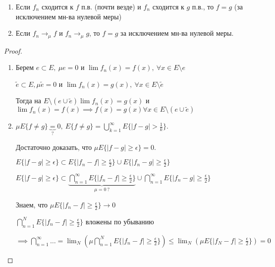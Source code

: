 \begin{statement}
    \begin{enumerate}
        \item {
            Если $f_n$ сходится к $f$ п.в. (почти везде) и $f_n$ сходится к $g$ п.в., то $f = g$ (за исключением мн-ва нулевой меры)
        }
        \item {
            Если $f_n \rightarrow_{\mu} f$ и $f_n \rightarrow_{\mu} g$, то $f = g$ за исключением мн-ва нулевой меры.
        }
    \end{enumerate}
\end{statement}
\begin{proof}
    \begin{enumerate}
        \item {
            Берем $e \subset E, \ \mu e = 0$ и $\lim{f_n(x)} = f(x), \ \forall x \in E \setminus e$

            $\tilde{e} \subset E, \mu \tilde{e} = 0$ и $\lim{f_n(x)} = g(x), \ \forall x \in E \setminus \tilde{e}$
        
            Тогда на $E \setminus (e \cup \tilde{e}) \lim f_n(x) = g(x)$ и $\lim f_n(x) = f(x) \implies f(x) = g(x) \forall x \in E \setminus (e \cup \tilde{e})$ 
        }
        \item {
            $\mu E \{ f \not = g \} \underbrace{=}_{?} 0, \ E\{ f \not = g \} = \bigcup_{k=1}^{\infty} E \{ |f - g| > \frac{1}{k} \}$.

            Достаточно доказать, что $\mu E \{ |f - g| \geq \epsilon \} = 0$.

            $E \{ |f - g| \geq \epsilon \} \subset E \{ |f_n - f| \geq \frac{\epsilon}{2} \} \cup E \{ |f_n - g| \geq \frac{\epsilon}{2} \}$


            $E \{ |f - g| \geq \epsilon \} \subset \underbrace{\bigcap_{n=1}^{\infty} E \{ |f_n - f| \geq \frac{\epsilon}{2} \}}_{\mu = 0 \ ?} \cup \bigcap_{n=1}^{\infty} E \{ |f_n - g| \geq \frac{\epsilon}{2} \}$

            Знаем, что $\mu E \{ |f_n - f| \geq \frac{\epsilon}{2} \} \rightarrow 0$

            $\bigcap_{n=1}^{N} E \{ |f_n - f| \geq \frac{\epsilon}{2} \}$ вложены по убыванию

            $\implies \bigcap_{n=1}^{\infty} \dots = \lim_{N} \left( { \mu \bigcap_{n=1}^{N} E \{ |f_n - f| \geq \frac{\epsilon}{2} \} } \right) \leq \lim_{N} \left( {\mu E \{ |f_N - f| \geq \frac{\epsilon}{2} \}}\right) = 0$
        }
    \end{enumerate}
\end{proof}

